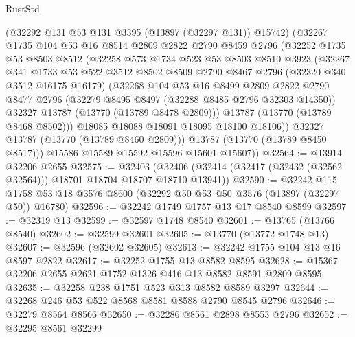 \begin{lexlean}{RustStd}
\begin{coremodule}
          (@32292 @131 @53 @131 @3395 (@13897 (@32297 @131)) @15742)
          (@32267
            @1735
            @104
            @53
            @16
            @8514
            @2809
            @2822
            @2790
            @8459
            @2796
            (@32252
              @1735
              @53
              @8503
              @8512
              (@32258
                @573
                @1734
                @523
                @53
                @8503
                @8510
                @3923
                (@32267
                  @341
                  @1733
                  @53
                  @522
                  @3512
                  @8502
                  @8509
                  @2790
                  @8467
                  @2796
                  (@32320 @340 @3512 @16175 @16179)
                  (@32268
                    @104
                    @53
                    @16
                    @8499
                    @2809
                    @2822
                    @2790
                    @8477
                    @2796
                    (@32279 @8495 @8497 (@32288 @8485 @2796 @32303 @14350))
                    @32327
                    @13787
                    (@13770 (@13789 @8478 @2809)))
                  @13787
                  (@13770 (@13789 @8468 @8502)))
                @18085
                @18088
                @18091
                @18095
                @18100
                @18106))
            @32327
            @13787
            (@13770 (@13789 @8460 @2809)))
          @13787
          (@13770 (@13789 @8450 @8517)))
        @15586
        @15589
        @15592
        @15596
        @15601
        @15607))
@32564 := @13914 @32206 @2655
@32575 := @32403
    (@32406 (@32414 (@32417 (@32432 (@32562 @32564))) @18701 @18704 @18707 @18710 @13941))
@32590 := @32242
    @115
    @1758
    @53
    @18
    @3576
    @8600
    (@32292 @50 @53 @50 @3576 (@13897 (@32297 @50)) @16780)
@32596 := @32242 @1749 @1757 @13 @17 @8540 @8599
@32597 := @32319 @13
@32599 := @32597 @1748 @8540
@32601 := @13765 (@13766 @8540)
@32602 := @32599 @32601
@32605 := @13770 (@13772 @1748 @13)
@32607 := @32596 (@32602 @32605)
@32613 := @32242 @1755 @104 @13 @16 @8597 @2822
@32617 := @32252 @1755 @13 @8582 @8595
@32628 := @15367 @32206 @2655 @2621 @1752 @1326 @416 @13 @8582 @8591 @2809 @8595
@32635 := @32258 @238 @1751 @523 @313 @8582 @8589 @3297
@32644 := @32268 @246 @53 @522 @8568 @8581 @8588 @2790 @8545 @2796
@32646 := @32279 @8564 @8566
@32650 := @32286 @8561 @2898 @8553 @2796
@32652 := @32295 @8561 @32299

\end{coremodule}
\end{lexlean}

